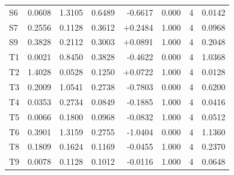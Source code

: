 \begin{table}[!htbp]
\begin{tabular}{lrrrrrrr}
S6 & 0.0608 & 1.3105 & 0.6489 & -0.6617 & 0.000 & 4 & 0.0142 \\
S7 & 0.2556 & 0.1128 & 0.3612 & +0.2484 & 1.000 & 4 & 0.0968 \\
S9 & 0.3828 & 0.2112 & 0.3003 & +0.0891 & 1.000 & 4 & 0.2048 \\
T1 & 0.0021 & 0.8450 & 0.3828 & -0.4622 & 0.000 & 4 & 1.0368 \\
T2 & 1.4028 & 0.0528 & 0.1250 & +0.0722 & 1.000 & 4 & 0.0128 \\
T3 & 0.2009 & 1.0541 & 0.2738 & -0.7803 & 0.000 & 4 & 0.6200 \\
T4 & 0.0353 & 0.2734 & 0.0849 & -0.1885 & 1.000 & 4 & 0.0416 \\
T5 & 0.0066 & 0.1800 & 0.0968 & -0.0832 & 1.000 & 4 & 0.0512 \\
T6 & 0.3901 & 1.3159 & 0.2755 & -1.0404 & 0.000 & 4 & 1.1360 \\
T8 & 0.1809 & 0.1624 & 0.1169 & -0.0455 & 1.000 & 4 & 0.2370 \\
T9 & 0.0078 & 0.1128 & 0.1012 & -0.0116 & 1.000 & 4 & 0.0648 \\
\bottomrule
\end{tabular}
\end{table}


